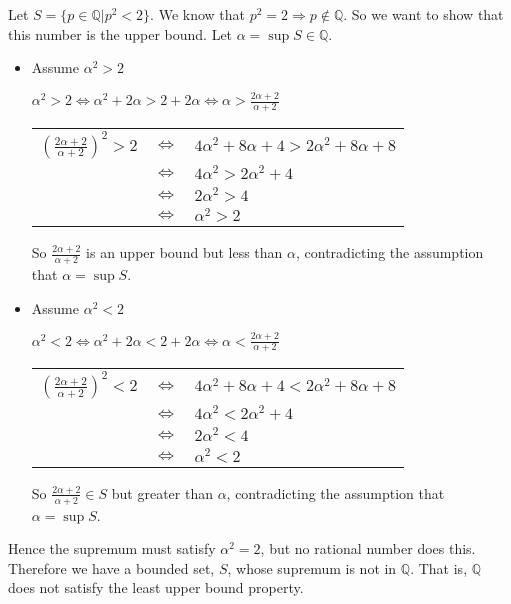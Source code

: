 \documentclass[11pt]{article}
\begin{document}
\begin{enumerate}
Let $S = \{p \in \mathbb{Q} | p^2 < 2\}$.  We know that $p^2 = 2 \Rightarrow p \notin \mathbb{Q}$.  So we want to show that this number is the upper bound.  Let $\alpha = \sup{S} \in \mathbb{Q}$.

\begin{itemize}
\item Assume $\alpha^2 > 2$

$\alpha^2 > 2 \Leftrightarrow \alpha^2 + 2\alpha > 2 + 2\alpha \Leftrightarrow \alpha > \frac{2\alpha + 2}{\alpha+2}$

\begin{tabular}{lll}
$(\frac{2\alpha + 2}{\alpha+2})^2 > 2$ 	& $\Leftrightarrow$ 	& $4\alpha^2 + 8\alpha + 4 > 2\alpha^2 + 8\alpha + 8$ \\
					& $\Leftrightarrow$	& $4\alpha^2 > 2\alpha^2 + 4$ \\
					& $\Leftrightarrow$	& $2\alpha^2 > 4$ \\
					& $\Leftrightarrow$	& $\alpha^2 > 2$
\end{tabular}

So $\frac{2\alpha + 2}{\alpha+2}$ is an upper bound but less than $\alpha$, contradicting the assumption that $\alpha = \sup{S}$.

\item Assume $\alpha^2 < 2$

$\alpha^2 < 2 \Leftrightarrow \alpha^2 + 2\alpha < 2 + 2\alpha \Leftrightarrow \alpha < \frac{2\alpha + 2}{\alpha+2}$

\begin{tabular}{lll}
$(\frac{2\alpha + 2}{\alpha+2})^2 < 2$ 	& $\Leftrightarrow$ 	& $4\alpha^2 + 8\alpha + 4 < 2\alpha^2 + 8\alpha + 8$ \\
					& $\Leftrightarrow$	& $4\alpha^2 < 2\alpha^2 + 4$ \\
					& $\Leftrightarrow$	& $2\alpha^2 < 4$ \\
					& $\Leftrightarrow$	& $\alpha^2 < 2$
\end{tabular}

So $\frac{2\alpha + 2}{\alpha+2} \in S$ but greater than $\alpha$, contradicting the assumption that $\alpha = \sup{S}$.
\end{itemize}
Hence the supremum must satisfy $\alpha^2 = 2$, but no rational number does this.  Therefore we have a bounded set, $S$, whose supremum is not in $\mathbb{Q}$.  That is, $\mathbb{Q}$ does not satisfy the least upper bound property.


\end{enumerate}
\end{document}
